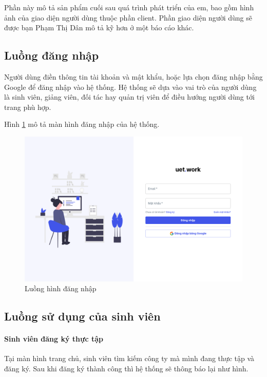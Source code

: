 \documentclass[./../main.tex]{subfiles}
\begin{document}
Phần này mô tả sản phẩm cuối sau quá trình phát triển của em, bao gồm
hình ảnh của giao diện người dùng thuộc phần client. Phần giao diện
người dùng sẽ được bạn Phạm Thị Dân mô tả kỹ hơn ở một báo cáo khác.

\subsection{Luồng đăng nhập}

Người dùng điền thông tin tài khoản và mật khẩu, hoặc lựa chọn đăng nhập
bằng Google để đăng nhập vào hệ thống. Hệ thống sẽ dựa vào vai trò của
người dùng là sinh viên, giảng viên, đối tác hay quản trị viên để điều
hướng người dùng tới trang phù hợp.

Hình \ref{fig:login_page} mô tả màn hình đăng nhập của hệ thống.

\begin{figure}[]
	\includegraphics[width=\linewidth]{./images/image5.png}
	\caption{Luồng hình đăng nhập}
	\label{fig:login_page}
\end{figure}

\subsection{Luồng sử dụng của sinh viên}

\paragraph*{Sinh viên đăng ký thực tập}

Tại màn hình trang chủ, sinh viên tìm kiếm công ty mà mình đang thực tập và đăng ký. Sau khi đăng ký thành công thì hệ thống sẽ thông báo lại như hình.
\end{document}
